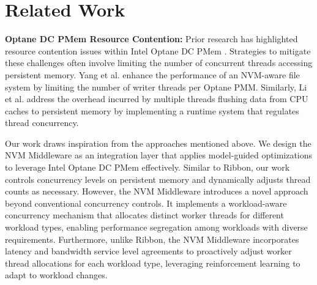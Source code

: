 \chapter{Related Work}

\textbf{Optane DC PMem Resource Contention:} Prior research has highlighted resource contention issues within Intel Optane DC PMem \cite{yang2020empirical,wu2020ribbon}. Strategies to mitigate these challenges often involve limiting the number of concurrent threads accessing persistent memory. Yang et al. \cite{yang2020empirical} enhance the performance of an NVM-aware file system by limiting the number of writer threads per Optane PMM. Similarly, Li et al. \cite{wu2020ribbon} address the overhead incurred by multiple threads flushing data from CPU caches to persistent memory by implementing a runtime system that regulates thread concurrency.

Our work draws inspiration from the approaches mentioned above. We design the NVM Middleware as an integration layer that applies model-guided optimizations to leverage Intel Optane DC PMem effectively. Similar to Ribbon, our work controls concurrency levels on persistent memory and dynamically adjusts thread counts as necessary. However, the NVM Middleware introduces a novel approach beyond conventional concurrency controls. It implements a workload-aware concurrency mechanism that allocates distinct worker threads for different workload types, enabling performance segregation among workloads with diverse requirements. Furthermore, unlike Ribbon, the NVM Middleware incorporates latency and bandwidth service level agreements to proactively adjust worker thread allocations for each workload type, leveraging reinforcement learning to adapt to workload changes.



